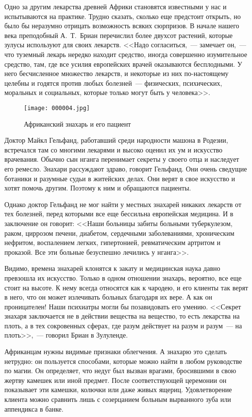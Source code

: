 \documentclass[12pt,a4paper,twoside,openany,svgnames]{memoir}
\begin{document}
Одно за другим лекарства древней Африки становятся известными у нас и испытываются на практике. Трудно сказать, сколько еще предстоит открыть, но было бы неразумно отрицать возможность всяких сюрпризов. В начале нашего века преподобный А.~Т.~Бриан перечислил более двухсот растений, которые зулусы используют для своих лекарств. <<Надо согласиться,~--- замечает он,~--- что туземный лекарь нередко находит средство, иногда совершенно изумительное средство, там, где все усилия европейских врачей оказываются бесплодными. У него бесчисленное множество лекарств, и некоторые из них по-настоящему целебны и годятся против любых болезней~--- физических, психических, моральных и социальных, которые только могут быть у человека>>.

\begin{figure}[ht!]
\centering
\texttt{[image: 000004.jpg]}
\caption{Африканский знахарь и его пациент}
\label{overflow}
\end{figure}


Доктор Майкл Гельфанд, работавший среди народности машона в Родезии, встречался там со многими лекарями и высоко оценил их ум и искусство врачевания. Обычно сын нганга перенимает секреты у своего отца и наследует его ремесло. Знахари рассуждают здраво, говорит Гельфанд. Они очень сведущие ботаники и разумные судьи в житейских делах. Они верят в свое искусство и хотят помочь другим. Поэтому к ним и обращаются пациенты.

Однако доктор Гельфанд не мог найти у местных знахарей никаких лекарств от тех болезней, перед которыми все еще бессильна европейская медицина. И в заключение он говорит: <<Наши больницы забиты больными туберкулезом, раком, циррозом печени, диабетом, сердечными заболеваниями, хроническим нефритом, воспалением легких, гипертонией, ревматическим артритом и проказой. Все эти больные безуспешно лечились у нганга>>.

Видимо, времена знахарей клонятся к закату и медицинская наука давно превзошла их искусство. Только в одном отношении знахарь, вероятно, все еще стоит на высоте. К нему всегда относятся как к чародею, и его клиенты так верят в него, что он может излечивать больных благодаря их вере. А как он проницателен! Наши психиатры могли бы позавидовать его умению. <<Секрет знахаря заключается не в действии вещества на вещество, то есть лекарства на плоть, а в тех сокровенных сферах, где разум действует на разум и разум~--- на плоть>>,~--- говорил Бриан в Зулуленде.

Африканцам нужны видимые признаки облегчения. А знахарю это сделать нетрудно: он пользуется способами, которые можно найти в любом руководстве по магии. Он определяет, что недуг был вызван врагами, бросившими в свою жертву камешек или иной предмет. После соответствующей церемонии он показывает эти камешки, колючки или даже живых ящериц. Удовлетворение клиента можно сравнить лишь с созерцанием больным вырванного зуба или аппендикса в банке.
\end{document}
